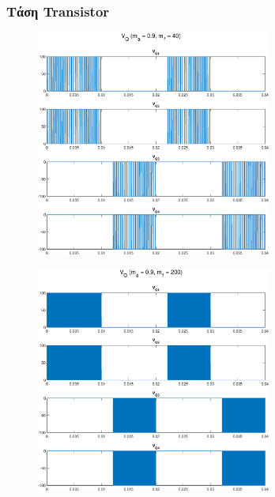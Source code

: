 \begin{figure}[h!]
	\subsubsection*{Τάση Transistor}
		\begin{subfigure}{0.49\textwidth}
		\centering
		\includegraphics[width=0.85\textwidth]{Images/V_Q_40}
	\end{subfigure}
	\begin{subfigure}{0.49\textwidth}
		\centering
		\includegraphics[width=0.85\textwidth]{Images/V_Q_200}
	\end{subfigure}
\end{figure}

